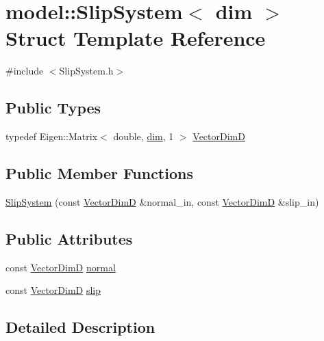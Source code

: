 \hypertarget{structmodel_1_1_slip_system}{}\section{model\+:\+:Slip\+System$<$ dim $>$ Struct Template Reference}
\label{structmodel_1_1_slip_system}


{\ttfamily \#include $<$Slip\+System.\+h$>$}

\subsection*{Public Types}
\begin{DoxyCompactItemize}
\item 
typedef Eigen\+::\+Matrix$<$ double, \hyperlink{plot_nd_a_8m_a382f3ca768b275b8d563604f7fc7df73}{dim}, 1 $>$ \hyperlink{structmodel_1_1_slip_system_a5c1924f2f21ece7ef4f80d46267366e8}{Vector\+Dim\+D}
\end{DoxyCompactItemize}
\subsection*{Public Member Functions}
\begin{DoxyCompactItemize}
\item 
\hyperlink{structmodel_1_1_slip_system_a2ef9a3032485844e28424951f56188f3}{Slip\+System} (const \hyperlink{structmodel_1_1_slip_system_a5c1924f2f21ece7ef4f80d46267366e8}{Vector\+Dim\+D} \&normal\+\_\+in, const \hyperlink{structmodel_1_1_slip_system_a5c1924f2f21ece7ef4f80d46267366e8}{Vector\+Dim\+D} \&slip\+\_\+in)
\end{DoxyCompactItemize}
\subsection*{Public Attributes}
\begin{DoxyCompactItemize}
\item 
const \hyperlink{structmodel_1_1_slip_system_a5c1924f2f21ece7ef4f80d46267366e8}{Vector\+Dim\+D} \hyperlink{structmodel_1_1_slip_system_a090561749e7b4a268d9fed486b8047fe}{normal}
\item 
const \hyperlink{structmodel_1_1_slip_system_a5c1924f2f21ece7ef4f80d46267366e8}{Vector\+Dim\+D} \hyperlink{structmodel_1_1_slip_system_a56572818743fe20aa95de4b8b6b7bbe6}{slip}
\end{DoxyCompactItemize}


\subsection{Detailed Description}
